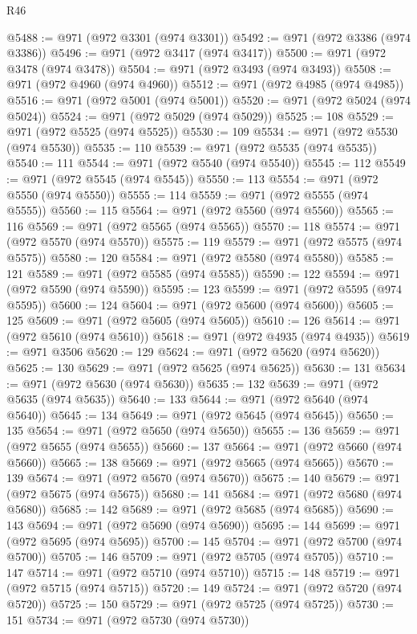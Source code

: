 \begin{lexlean}{R46}
\begin{coremodule}
@5488 := @971 (@972 @3301 (@974 @3301))
@5492 := @971 (@972 @3386 (@974 @3386))
@5496 := @971 (@972 @3417 (@974 @3417))
@5500 := @971 (@972 @3478 (@974 @3478))
@5504 := @971 (@972 @3493 (@974 @3493))
@5508 := @971 (@972 @4960 (@974 @4960))
@5512 := @971 (@972 @4985 (@974 @4985))
@5516 := @971 (@972 @5001 (@974 @5001))
@5520 := @971 (@972 @5024 (@974 @5024))
@5524 := @971 (@972 @5029 (@974 @5029))
@5525 := 108
@5529 := @971 (@972 @5525 (@974 @5525))
@5530 := 109
@5534 := @971 (@972 @5530 (@974 @5530))
@5535 := 110
@5539 := @971 (@972 @5535 (@974 @5535))
@5540 := 111
@5544 := @971 (@972 @5540 (@974 @5540))
@5545 := 112
@5549 := @971 (@972 @5545 (@974 @5545))
@5550 := 113
@5554 := @971 (@972 @5550 (@974 @5550))
@5555 := 114
@5559 := @971 (@972 @5555 (@974 @5555))
@5560 := 115
@5564 := @971 (@972 @5560 (@974 @5560))
@5565 := 116
@5569 := @971 (@972 @5565 (@974 @5565))
@5570 := 118
@5574 := @971 (@972 @5570 (@974 @5570))
@5575 := 119
@5579 := @971 (@972 @5575 (@974 @5575))
@5580 := 120
@5584 := @971 (@972 @5580 (@974 @5580))
@5585 := 121
@5589 := @971 (@972 @5585 (@974 @5585))
@5590 := 122
@5594 := @971 (@972 @5590 (@974 @5590))
@5595 := 123
@5599 := @971 (@972 @5595 (@974 @5595))
@5600 := 124
@5604 := @971 (@972 @5600 (@974 @5600))
@5605 := 125
@5609 := @971 (@972 @5605 (@974 @5605))
@5610 := 126
@5614 := @971 (@972 @5610 (@974 @5610))
@5618 := @971 (@972 @4935 (@974 @4935))
@5619 := @971 @3506
@5620 := 129
@5624 := @971 (@972 @5620 (@974 @5620))
@5625 := 130
@5629 := @971 (@972 @5625 (@974 @5625))
@5630 := 131
@5634 := @971 (@972 @5630 (@974 @5630))
@5635 := 132
@5639 := @971 (@972 @5635 (@974 @5635))
@5640 := 133
@5644 := @971 (@972 @5640 (@974 @5640))
@5645 := 134
@5649 := @971 (@972 @5645 (@974 @5645))
@5650 := 135
@5654 := @971 (@972 @5650 (@974 @5650))
@5655 := 136
@5659 := @971 (@972 @5655 (@974 @5655))
@5660 := 137
@5664 := @971 (@972 @5660 (@974 @5660))
@5665 := 138
@5669 := @971 (@972 @5665 (@974 @5665))
@5670 := 139
@5674 := @971 (@972 @5670 (@974 @5670))
@5675 := 140
@5679 := @971 (@972 @5675 (@974 @5675))
@5680 := 141
@5684 := @971 (@972 @5680 (@974 @5680))
@5685 := 142
@5689 := @971 (@972 @5685 (@974 @5685))
@5690 := 143
@5694 := @971 (@972 @5690 (@974 @5690))
@5695 := 144
@5699 := @971 (@972 @5695 (@974 @5695))
@5700 := 145
@5704 := @971 (@972 @5700 (@974 @5700))
@5705 := 146
@5709 := @971 (@972 @5705 (@974 @5705))
@5710 := 147
@5714 := @971 (@972 @5710 (@974 @5710))
@5715 := 148
@5719 := @971 (@972 @5715 (@974 @5715))
@5720 := 149
@5724 := @971 (@972 @5720 (@974 @5720))
@5725 := 150
@5729 := @971 (@972 @5725 (@974 @5725))
@5730 := 151
@5734 := @971 (@972 @5730 (@974 @5730))

\end{coremodule}
\end{lexlean}

